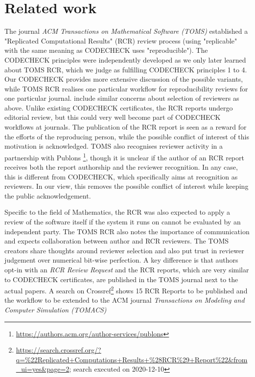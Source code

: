 \documentclass[12pt]{article}
\begin{document}
\section*{Related work}\label{related-work}

The journal \emph{ACM Transactions on Mathematical Software (TOMS)} 
established a "Replicated Computational Results" (RCR) review process
\cite{heroux_editorial_2015} (using "replicable" with the same meaning 
as CODECHECK uses "reproducible").
The CODECHECK principles were independently developed as we only later 
learned about TOMS RCR, which we judge as fulfilling CODECHECK principles
1 to 4.
Our CODECHECK provides more extensive discussion of the possible variants, 
while TOMS RCR realises one particular workflow for reproducibility 
reviews for one particular journal. \cite{heroux_editorial_2015}
include similar concerns about
selection of reviewers as above. Unlike existing CODECHECK certificates, 
the RCR reports undergo editorial review, but this could very well become
part of CODECHECK workflows at journals.
The publication of the RCR report is seen as a reward for the efforts of
the reproducing person, while the possible conflict of interest of this 
motivation is acknowledged. TOMS also recognises reviewer activity in a 
partnership with Publons
\footnote{\url{https://authors.acm.org/author-services/publons}},
though it is unclear if the author of an RCR report receives both the report
authorship and the reviewer recognition. In any case, this is different
from CODECHECK, which specifically aims at recognition as reviewers.
In our view, this removes the possible conflict of interest while keeping
the public acknowledgement.

Specific to the field of Mathematics, the RCR was also  expected to apply a
review of the software itself if the system it runs on cannot be evaluated by
an independent party.
The TOMS RCR also notes the importance of communication and expects
collaboration between author and RCR reviewers.
The TOMS creators share thoughts around reviewer selection and also put trust
in reviewer judgement over numerical bit-wise perfection.
A key difference is that authors opt-in with an \emph{RCR Review Request} and
the RCR reports, which are very similar to CODECHECK certificates, are
published in the TOMS journal next to the actual papers.
A search on Crossref\footnote{\url{https://search.crossref.org/?q=\%22Replicated+Computations+Results+\%28RCR\%29+Report\%22&from_ui=yes&page=2}; search executed
on 2020-12-10} shows 15 RCR Reports to be published and the workflow to be 
extended to the ACM journal \emph{Transactions on Modeling and Computer 
  Simulation (TOMACS)}
\end{document}
